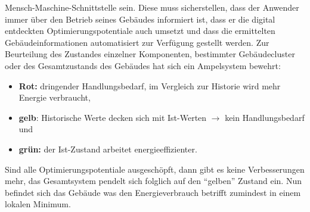 Mensch-Maschine-Schnittstelle sein. Diese muss sicherstellen, dass der Anwender immer über den Betrieb seines Gebäudes informiert ist, dass er die digital entdeckten Optimierungspotentiale auch umsetzt und dass die ermittelten Gebäudeinformationen automatisiert zur Verfügung gestellt werden. Zur Beurteilung des Zustandes einzelner Komponenten, bestimmter Gebäudecluster oder des Gesamtzustands des Gebäudes hat sich ein Ampelsystem bewehrt:

\begin{itemize}
    \itemsep0em
    \item[] \textbf{Rot:} dringender Handlungsbedarf, im Vergleich zur Historie wird mehr Energie verbraucht,
    \item[] \textbf{gelb}: Historische Werte decken sich mit Ist-Werten $\rightarrow$ kein Handlungsbedarf und
    \item[] \textbf{grün:} der Ist-Zustand arbeitet energieeffizienter. 
\end{itemize}

Sind alle Optimierungspotentiale ausgeschöpft, dann gibt es keine Verbesserungen mehr, das Gesamtsystem pendelt sich folglich auf den \enquote{gelben} Zustand ein. Nun befindet sich das Gebäude was den Energieverbrauch betrifft zumindest in einem lokalen Minimum.
